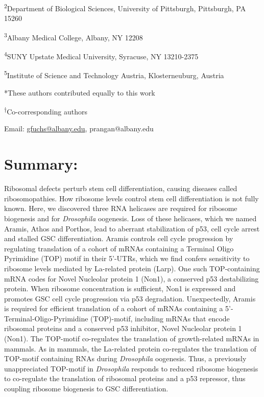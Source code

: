 \documentclass[12pt,oneside]{reedthesis}
\begin{document}
\textsuperscript{2}Department of Biological Sciences, University of Pittsburgh,
Pittsburgh, PA 15260

\textsuperscript{3}Albany Medical College, Albany, NY 12208

\textsuperscript{4}SUNY Upstate Medical University, Syracuse, NY 13210-2375

\textsuperscript{5}Institute of Science and Technology Austria, Klosterneuburg, Austria

*These authors contributed equally to this work

\textsuperscript{†}Co-corresponding authors

Email: \href{mailto:gfuchs@albany.edu}{{gfuchs@albany.edu}},
{prangan@albany.edu}

\hypertarget{summary-1}{%
\section{Summary:}\label{summary-1}}

Ribosomal defects perturb stem cell differentiation, causing diseases called ribosomopathies. How ribosome levels control stem cell differentiation is not fully known. Here, we discovered three RNA helicases are required for ribosome biogenesis and for \emph{Drosophila} oogenesis. Loss of these helicases, which we named Aramis, Athos and Porthos, lead to aberrant stabilization of p53, cell cycle arrest and stalled GSC differentiation. Aramis controls cell cycle progression by regulating translation of a cohort of mRNAs containing a Terminal Oligo Pyrimidine (TOP) motif in their 5'-UTRs, which we find confers sensitivity to ribosome levels mediated by La-related protein (Larp). One such TOP-containing mRNA codes for Novel Nucleolar protein 1 (Non1), a conserved p53 destabilizing protein. When ribosome concentration is sufficient, Non1 is expressed and promotes GSC cell cycle progression via p53 degradation. Unexpectedly, Aramis is required for efficient translation of a cohort of mRNAs containing a 5'-Terminal-Oligo-Pyrimidine (TOP)-motif, including mRNAs that encode ribosomal proteins and a conserved p53 inhibitor, Novel Nucleolar protein 1 (Non1). The TOP-motif co-regulates the translation of growth-related mRNAs in mammals. As in mammals, the La-related protein co-regulates the translation of TOP-motif containing RNAs during \emph{Drosophila} oogenesis. Thus, a previously unappreciated TOP-motif in \emph{Drosophila} responds to reduced ribosome biogenesis to co-regulate the translation of ribosomal proteins and a p53 repressor, thus coupling ribosome biogenesis to GSC differentiation.
\end{document}
